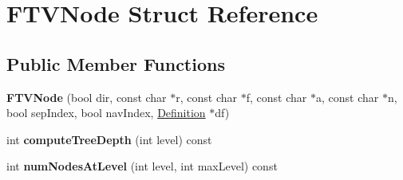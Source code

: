 \hypertarget{struct_f_t_v_node}{}\section{F\+T\+V\+Node Struct Reference}
\label{struct_f_t_v_node}
\subsection*{Public Member Functions}
\begin{DoxyCompactItemize}
\item 
\mbox{\label{struct_f_t_v_node_a8dc5d27f90a72e693407fed361e0370e}} 
{\bfseries F\+T\+V\+Node} (bool dir, const char $\ast$r, const char $\ast$f, const char $\ast$a, const char $\ast$n, bool sep\+Index, bool nav\+Index, \mbox{\hyperlink{class_definition}{Definition}} $\ast$df)
\item 
\mbox{\label{struct_f_t_v_node_aa4166ffd2eb641a6ddb5c82f9cb6a142}} 
int {\bfseries compute\+Tree\+Depth} (int level) const
\item 
\mbox{\label{struct_f_t_v_node_a909a05c25240d435e54e9ebcc2e24f8f}} 
int {\bfseries num\+Nodes\+At\+Level} (int level, int max\+Level) const
\end{DoxyCompactItemize}
